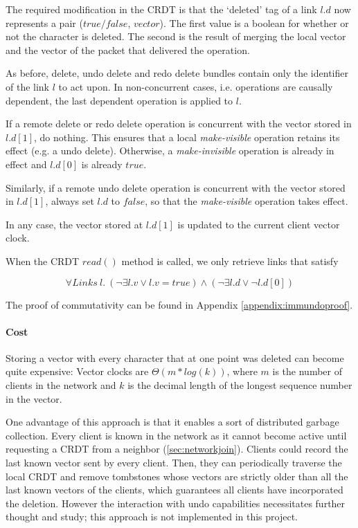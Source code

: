 \documentclass[12pt,a4paper,twoside,openright]{report}
\begin{document}
			The required modification in the CRDT is that the `deleted' tag of a link $l.d$ now represents a pair ($true/false$, $vector$). The first value is a boolean for whether or not the character is deleted. The second is the result of merging the local vector and the vector of the packet that delivered the operation.
			
			As before, delete, undo delete and redo delete bundles contain only the identifier of the link $l$ to act upon. In non-concurrent cases, i.e. operations are causally dependent, the last dependent operation is applied to $l$. 
			
			If a remote delete or redo delete operation is concurrent with the vector stored in $l.d[1]$, do nothing. This ensures that a local \textit{make-visible} operation retains its effect (e.g. a undo delete). Otherwise, a \textit{make-invisible} operation is already in effect and $l.d[0]$ is already $true$.
			
			Similarly, if a remote undo delete operation is concurrent with the vector stored in $l.d[1]$, always set $l.d$ to $false$, so that the \textit{make-visible} operation takes effect.
			
			In any case, the vector stored at $l.d[1]$ is updated to the current client vector clock.
			
			When the CRDT $read()$ method is called, we only retrieve links that satisfy
			
					\[\forall Links\ l.\  (\lnot\exists l.v \lor l.v = true) \land (\lnot\exists l.d \lor \lnot l.d[0]) \] 
						
			The proof of commutativity can be found in Appendix \ref{appendix:immundoproof}.
			
			
			
			
			
			\paragraph{Cost} \label{sec:immundo:cost}
			Storing a vector with every character that at one point was deleted can become quite expensive: Vector clocks are $\Theta (m*log(k))$, where $m$ is the number of clients in the network and $k$ is the decimal length of the longest sequence number in the vector.
			
			One advantage of this approach is that it enables a sort of distributed garbage collection. Every client is known in the network as it cannot become active until requesting a CRDT from a neighbor (\cref{sec:networkjoin}). Clients could record the last known vector sent by every client. Then, they can periodically traverse the local CRDT and remove tombstones whose vectors are strictly older than all the last known vectors of the clients, which guarantees all clients have incorporated the deletion. However the interaction with undo capabilities necessitates further thought and study; this approach is not implemented in this project.
			
\end{document}

